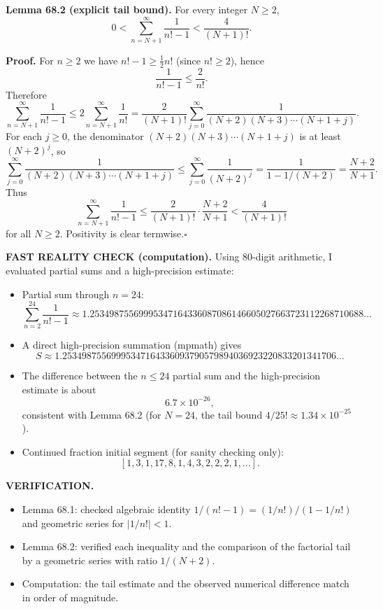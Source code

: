 \medskip
\noindent\textbf{Lemma 68.2 (explicit tail bound).}
For every integer $N\ge 2$,
\[
0<\sum_{n=N+1}^{\infty}\frac{1}{n!-1}
<\frac{4}{(N+1)!}.
\]

\noindent\textbf{Proof.}
For $n\ge 2$ we have $n!-1\ge \frac12 n!$ (since $n!\ge 2$), hence
\[\frac{1}{n!-1}\le \frac{2}{n!}.\]
Therefore
\[
\sum_{n=N+1}^{\infty}\frac{1}{n!-1}
\le 2\sum_{n=N+1}^{\infty}\frac{1}{n!}
=\frac{2}{(N+1)!}\sum_{j=0}^{\infty}\frac{1}{(N+2)(N+3)\cdots (N+1+j)}.
\]
For each $j\ge 0$, the denominator $(N+2)(N+3)\cdots(N+1+j)$ is at least $(N+2)^j$, so
\[
\sum_{j=0}^{\infty}\frac{1}{(N+2)(N+3)\cdots (N+1+j)}
\le \sum_{j=0}^{\infty}\frac{1}{(N+2)^j}=\frac{1}{1-1/(N+2)}=\frac{N+2}{N+1}.
\]
Thus
\[
\sum_{n=N+1}^{\infty}\frac{1}{n!-1}
\le \frac{2}{(N+1)!}\cdot\frac{N+2}{N+1}
<\frac{4}{(N+1)!}
\]
for all $N\ge 2$. Positivity is clear termwise.\hfill$\square$

\medskip
\noindent\textbf{FAST REALITY CHECK (computation).}
Using 80-digit arithmetic, I evaluated partial sums and a high-precision estimate:
\begin{itemize}
\item Partial sum through $n=24$:
\[
\sum_{n=2}^{24}\frac{1}{n!-1}
\approx 1.25349875569995347164336087086146605027663723112268710688\dots
\]
\item A direct high-precision summation (mpmath) gives
\[
S\approx 1.25349875569995347164336093790579894036923220833201341706\dots
\]
\item The difference between the $n\le 24$ partial sum and the high-precision estimate is about
\[6.7\times 10^{-26},\]
consistent with Lemma 68.2 (for $N=24$, the tail bound $4/25!\approx 1.34\times 10^{-25}$).
\item Continued fraction initial segment (for sanity checking only):
\[[1, 3, 1, 17, 8, 1, 4, 3, 2, 2, 2, 1, \dots].\]
\end{itemize}

\medskip
\noindent\textbf{VERIFICATION.}
\begin{itemize}
\item Lemma 68.1: checked algebraic identity $1/(n!-1)=(1/n!)/(1-1/n!)$ and geometric series for $\lvert 1/n!\rvert<1$.
\item Lemma 68.2: verified each inequality and the comparison of the factorial tail by a geometric series with ratio $1/(N+2)$.
\item Computation: the tail estimate and the observed numerical difference match in order of magnitude.
\end{itemize}

